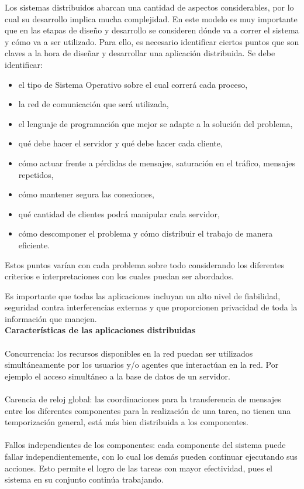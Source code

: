 Los sistemas distribuidos abarcan una cantidad de aspectos considerables, por lo cual su desarrollo implica mucha complejidad. En este modelo es muy importante que en las etapas de diseño y
 desarrollo se consideren dónde va a correr el sistema y cómo va a ser utilizado. Para ello, es necesario identificar ciertos puntos que son claves a la hora de diseñar y desarrollar una aplicación distribuida.
 Se debe identificar:

\begin{itemize}

 \item el tipo de Sistema Operativo sobre el cual correrá cada proceso,
 \item la red de comunicación que será utilizada,
 \item el lenguaje de programación que mejor se adapte a la solución del problema,
 \item qué debe hacer el servidor y qué debe hacer cada cliente,
 \item cómo actuar frente a pérdidas de mensajes, saturación en el tráfico, mensajes repetidos, 
 \item cómo mantener segura las conexiones,
 \item qué cantidad de clientes podrá manipular cada servidor,
 \item cómo descomponer el problema y cómo distribuir el trabajo de manera eficiente.

\end{itemize}
Estos puntos varían con cada problema sobre todo considerando los diferentes criterios e interpretaciones con los cuales puedan ser abordados.

Es importante que todas las aplicaciones incluyan un alto nivel de fiabilidad, seguridad contra interferencias externas y que proporcionen privacidad de toda la información que manejen.\\
 
\textbf{\newline Características de las aplicaciones distribuidas}\\
\\Concurrencia: los recursos disponibles en la red puedan ser utilizados simultáneamente por los usuarios y/o agentes que interactúan en la red. Por ejemplo el acceso simultáneo a la base de datos de un servidor.\\
\\Carencia de reloj global: las coordinaciones para la transferencia de mensajes entre los diferentes componentes para la realización de una tarea, no tienen una temporización general, está más bien distribuida a los componentes.\\
\\Fallos independientes de los componentes: cada componente del sistema puede fallar independientemente, con lo cual los demás pueden continuar ejecutando sus acciones.
 Esto permite el logro de las tareas con mayor efectividad, pues el sistema en su conjunto continúa trabajando.

